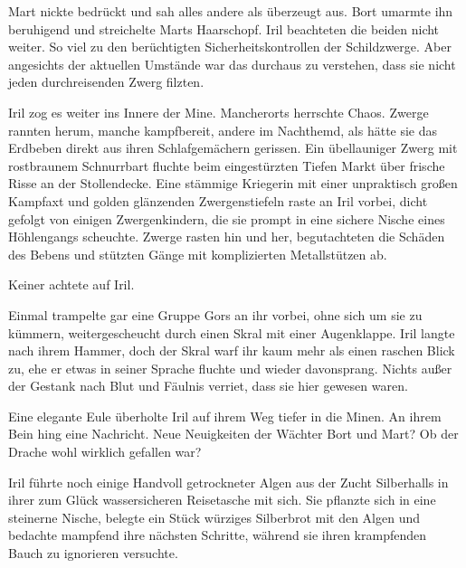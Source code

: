 Mart nickte bedrückt und sah alles andere als überzeugt aus. Bort umarmte ihn beruhigend und streichelte Marts Haarschopf. Iril beachteten die beiden nicht weiter. So viel zu den berüchtigten Sicherheitskontrollen der Schildzwerge. Aber angesichts der aktuellen Umstände war das durchaus zu verstehen, dass sie nicht jeden durchreisenden Zwerg filzten.



\trennzeichen



Iril zog es weiter ins Innere der Mine. Mancherorts herrschte Chaos. Zwerge rannten herum, manche kampfbereit, andere im Nachthemd, als hätte sie das Erdbeben direkt aus ihren Schlafgemächern gerissen. Ein übellauniger Zwerg mit rostbraunem Schnurrbart fluchte beim eingestürzten Tiefen Markt über frische Risse an der Stollendecke. Eine stämmige Kriegerin mit einer unpraktisch großen Kampfaxt und golden glänzenden Zwergenstiefeln raste an Iril vorbei, dicht gefolgt von einigen Zwergenkindern, die sie prompt in eine sichere Nische eines Höhlengangs scheuchte. Zwerge rasten hin und her, begutachteten die Schäden des Bebens und stützten Gänge mit komplizierten Metallstützen ab.

Keiner achtete auf Iril.

Einmal trampelte gar eine Gruppe Gors an ihr vorbei, ohne sich um sie zu kümmern, weitergescheucht durch einen Skral mit einer Augenklappe. Iril langte nach ihrem Hammer, doch der Skral warf ihr kaum mehr als einen raschen Blick zu, ehe er etwas in seiner Sprache fluchte und wieder davonsprang. Nichts außer der Gestank nach Blut und Fäulnis verriet, dass sie hier gewesen waren.

Eine elegante Eule überholte Iril auf ihrem Weg tiefer in die Minen. An ihrem Bein hing eine Nachricht. Neue Neuigkeiten der Wächter Bort und Mart? Ob der Drache wohl wirklich gefallen war?

Iril führte noch einige Handvoll getrockneter Algen aus der Zucht Silberhalls in ihrer zum Glück wassersicheren Reisetasche mit sich. Sie pflanzte sich in eine steinerne Nische, belegte ein Stück würziges Silberbrot mit den Algen und bedachte mampfend ihre nächsten Schritte, während sie ihren krampfenden Bauch zu ignorieren versuchte.


